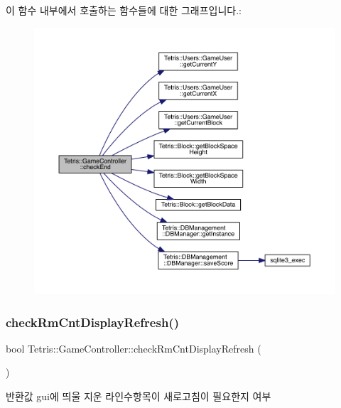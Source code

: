 이 함수 내부에서 호출하는 함수들에 대한 그래프입니다.\+:
\nopagebreak
\begin{figure}[H]
\begin{center}
\leavevmode
\includegraphics[width=350pt]{db/dd2/class_tetris_1_1_game_controller_ac8058c827eaa393194dcfb83c6964f8a_cgraph}
\end{center}
\end{figure}
\mbox{\label{class_tetris_1_1_game_controller_a1fcdadbf63bb0d908e1033496d6f9d16}} 
\subsubsection{\texorpdfstring{check\+Rm\+Cnt\+Display\+Refresh()}{checkRmCntDisplayRefresh()}}
{\footnotesize\ttfamily bool Tetris\+::\+Game\+Controller\+::check\+Rm\+Cnt\+Display\+Refresh (\begin{DoxyParamCaption}{ }\end{DoxyParamCaption})\hspace{0.3cm}{\ttfamily [inline]}}

\begin{DoxyReturn}{반환값}
gui에 띄울 \textquotesingle{}지운 라인수\textquotesingle{}항목이 새로고침이 필요한지 여부 
\end{DoxyReturn}


